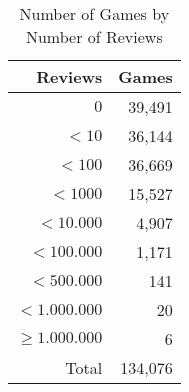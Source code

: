 \begin{table}[h]
    \centering
    \begin{tabular}{r|r}
Reviews & Games \\\hline
    $0$ & 39,491\\
    $< 10$  & 36,144\\
    $< 100$ & 36,669 \\
    $< 1000$ & 15,527\\
    $< 10.000$ & 4,907 \\
    $< 100.000$ & 1,171\\
    $< 500.000$ & 141 \\
    $< 1.000.000$ & 20\\
    $\geq1.000.000$ & 6\\\hline
    Total &  134,076
\end{tabular}
    \caption{Number of Games by Number of Reviews}
    \label{tab:game_metrics}
\end{table}